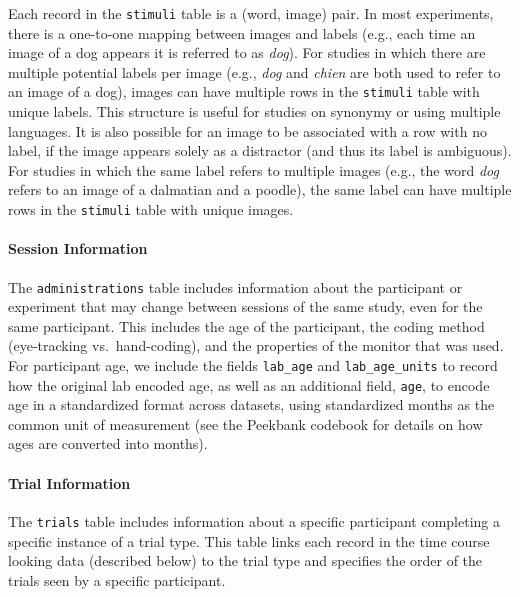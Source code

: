 \documentclass[
  english,
  man,floatsintext]{apa6}
\let\oldparagraph\paragraph
\renewcommand{\paragraph}[1]{\oldparagraph{#1}\mbox{}}
\begin{document}
Each record in the \texttt{stimuli} table is a (word, image) pair.
In most experiments, there is a one-to-one mapping between images and labels (e.g., each time an image of a dog appears it is referred to as \emph{dog}).
For studies in which there are multiple potential labels per image (e.g., \emph{dog} and \emph{chien} are both used to refer to an image of a dog), images can have multiple rows in the \texttt{stimuli} table with unique labels.
This structure is useful for studies on synonymy or using multiple languages.
It is also possible for an image to be associated with a row with no label, if the image appears solely as a distractor (and thus its label is ambiguous).
For studies in which the same label refers to multiple images (e.g., the word \emph{dog} refers to an image of a dalmatian and a poodle), the same label can have multiple rows in the \texttt{stimuli} table with unique images.

\hypertarget{session-information}{%
\paragraph{Session Information}\label{session-information}}

The \texttt{administrations} table includes information about the participant or experiment that may change between sessions of the same study, even for the same participant.
This includes the age of the participant, the coding method (eye-tracking vs.~hand-coding), and the properties of the monitor that was used.
For participant age, we include the fields \texttt{lab\_age} and \texttt{lab\_age\_units} to record how the original lab encoded age, as well as an additional field, \texttt{age}, to encode age in a standardized format across datasets, using standardized months as the common unit of measurement (see the Peekbank codebook for details on how ages are converted into months).

\hypertarget{trial-information}{%
\paragraph{Trial Information}\label{trial-information}}

The \texttt{trials} table includes information about a specific participant completing a specific instance of a trial type.
This table links each record in the time course looking data (described below) to the trial type and specifies the order of the trials seen by a specific participant.
\end{document}

